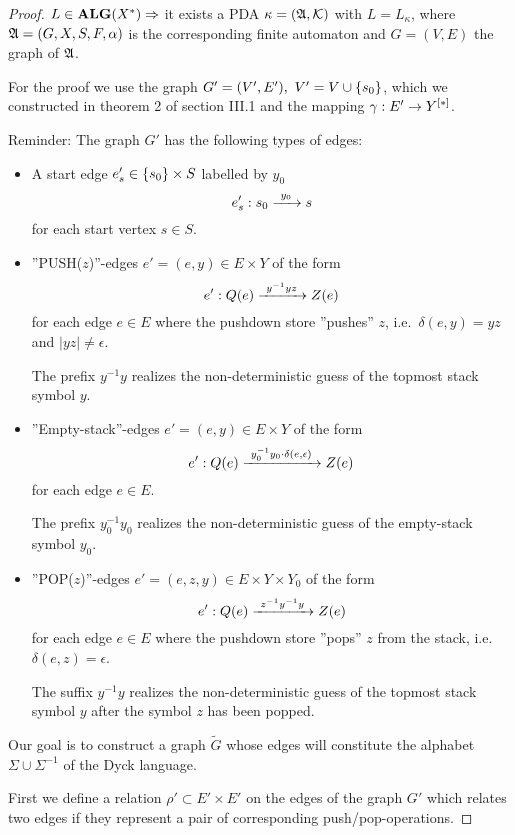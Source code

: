 \begin{proof}
$L\in \mbox{{\bf ALG}}(X^*) \Rightarrow$ it exists a PDA $\kappa=(\mbox{$\mathfrak{A}$},\mbox{$\mathcal{K}$})$ with
$L = L_\kappa$, where $\mbox{$\mathfrak{A}$}=(G, X, S, F, \alpha)$ is the corresponding finite
automaton and $G=(V, E)$ the graph of $\mbox{$\mathfrak{A}$}$.

For the proof we use the graph $G'=(V',E'),\ V' = V \cup \mbox{$\{s_0\}$}$, which we
constructed in theorem 2 of section III.1 and the mapping $\gamma: E' \to 
\mbox{${Y}^{[*]}$}$.

Reminder: The graph $G'$ has the following types of edges:
\begin{itemize}
  \item A start edge $e'_s \in \mbox{$\{s_0\}$} \times S$ labelled by $y_0$ 
  \[ e'_s: s_0 \xrightarrow{\ {y_0}\ } s \] 
  for each start vertex $s \in S$.
  
  \item ''PUSH($z$)''-edges $e'=(e, y) \in E \times Y$ of the form
  \[ e': Q(e) \xrightarrow{\ {y^{-1} y z}\ } Z(e) \]
  for each edge $e \in E$ where the pushdown store ''pushes'' $z$,
  i.e.\ $\delta(e, y) = yz$ and $|yz| \neq \epsilon$. 
  
  The prefix $y^{-1} y$ realizes the non-deterministic guess of the topmost
  stack symbol $y$.
  
  \item ''Empty-stack''-edges $e'=(e, y) \in E \times Y$ of the form
  \[ e': Q(e) \xrightarrow{\ {y_0^{-1} y_0 \cdot \delta(e, \epsilon)}\ } Z(e) \]
  for each edge $e \in E$.
  
  The prefix $y_0^{-1} y_0$ realizes the non-deterministic guess of the
  empty-stack symbol $y_0$.
  
  \item ''POP($z$)''-edges $e'=(e, z, y) \in E \times Y \times Y_0$ of the form
  \[ e': Q(e) \xrightarrow{\ {z^{-1} y^{-1} y}\ } Z(e) \]
  for each edge $e \in E$ where the pushdown store ''pops'' $z$ from the stack,
  i.e.\ $\delta(e, z) = \epsilon$.
  
  The suffix $y^{-1} y$ realizes the non-deterministic guess of the topmost
  stack symbol $y$ after the symbol $z$ has been popped.
\end{itemize}

Our goal is to construct a graph $\tilde{G}$ whose edges will constitute the
alphabet $\Sigma \cup \Sigma^{-1}$ of the Dyck language.

First we define a relation $\rho' \subset E' \times E'$ on the edges of the
graph $G'$ which relates two edges if they represent a pair of corresponding
push/pop-operations.


\end{proof}
